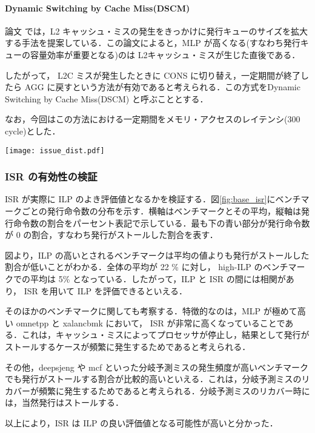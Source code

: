 \documentclass[twocolumn]{jsarticle}
\begin{document}
  \paragraph{Dynamic Switching by Cache Miss(DSCM)}
  論文\cite{Kora2013} では，L2 キャッシュ・ミスの発生をきっかけに発行キューのサイズを拡大する手法を提案している．この論文によると，MLP が高くなる(すなわち発行キューの容量効率が重要となる)のは L2キャッシュ・ミスが生じた直後である．

  したがって， L2C ミスが発生したときに CONS に切り替え，一定期間が終了したら AGG に戻すという方法が有効であると考えられる．この方式をDynamic Switching by Cache Miss(DSCM) と呼ぶこととする．

  なお，今回はこの方法における一定期間をメモリ・アクセスのレイテンシ(300 cycle)とした．

  \begin{figure*}[ht]
    \centering
    \texttt{[image: issue\_dist.pdf]}
    \caption{ベンチマークごとの 発行命令数の分布}  
    \label{fig:base_isr}
  \end{figure*}

  \subsubsection{ISR の有効性の検証}
  \label{sec:isr_}
  ISR が実際に ILP のよき評価値となるかを検証する．図\ref{fig:base_isr}にベンチマークごとの発行命令数の分布を示す．横軸はベンチマークとその平均，縦軸は発行命令数の割合をパーセント表記で示している．最も下の青い部分が発行命令数が 0 の割合，すなわち発行がストールした割合を表す．
  
  図より，ILP の高いとされるベンチマークは平均の値よりも発行がストールした割合が低いことがわかる．全体の平均が 22 \% に対し， high-ILP のベンチマークでの平均は 5\% となっている．したがって，ILP と ISR の間には相関があり， ISR を用いて ILP を評価できるといえる．

  そのほかのベンチマークに関しても考察する．特徴的なのは，MLP が極めて高い omnetpp と xalancbmk において， ISR が非常に高くなっていることである．これは，キャッシュ・ミスによってプロセッサが停止し，結果として発行がストールするケースが頻繁に発生するためであると考えられる．

  その他，deepsjeng や mcf といった分岐予測ミスの発生頻度が高いベンチマークでも発行がストールする割合が比較的高いといえる．これは，分岐予測ミスのリカバーが頻繁に発生するためであると考えられる．分岐予測ミスのリカバー時には，当然発行はストールする．

  以上により，ISR は ILP の良い評価値となる可能性が高いと分かった．
\end{document}

